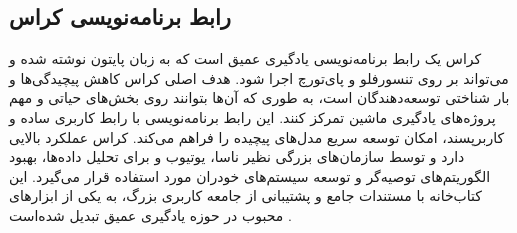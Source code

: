 \subsection[رابط برنامه‌نویسی کراس]{رابط برنامه‌نویسی کراس\protect{}}
کراس یک رابط برنامه‌نویسی یادگیری عمیق است که به زبان پایتون نوشته شده و می‌تواند بر روی  تنسورفلو و پای‌تورچ  اجرا شود. هدف اصلی کراس کاهش پیچیدگی‌ها و بار شناختی توسعه‌دهندگان است، 
به طوری که آن‌ها بتوانند روی بخش‌های حیاتی و مهم پروژه‌های یادگیری ماشین تمرکز کنند. این رابط برنامه‌نویسی با رابط کاربری ساده و کاربرپسند، امکان توسعه سریع مدل‌های پیچیده را فراهم
می‌کند. کراس عملکرد بالایی دارد و توسط سازمان‌های بزرگی نظیر ناسا، یوتیوب و  برای تحلیل داده‌ها، بهبود الگوریتم‌های توصیه‌گر و توسعه سیستم‌های خودران مورد استفاده قرار 
می‌گیرد. این کتاب‌خانه با مستندات جامع و پشتیبانی از جامعه کاربری بزرگ، به یکی از ابزارهای محبوب در حوزه یادگیری عمیق تبدیل شده‌است \cite{AboutKer57:online}.



